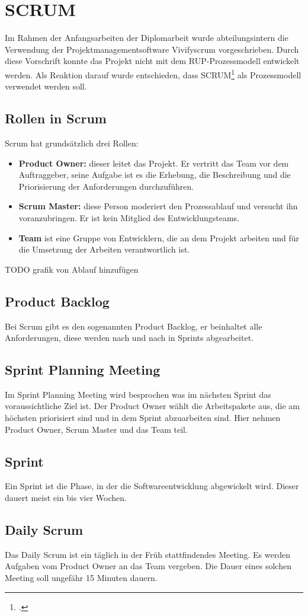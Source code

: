\section{SCRUM}
Im Rahmen der Anfangsarbeiten der Diplomarbeit wurde abteilungsintern die Verwendung der Projektmanagementsoftware Vivifyscrum vorgeschrieben. Durch diese Vorschrift konnte das Projekt nicht mit dem RUP-Prozessmodell entwickelt werden. 
Als Reaktion darauf wurde entschieden, dass SCRUM\footcite{scrum} als Prozessmodell verwendet werden soll.
\subsection{Rollen in Scrum}
Scrum hat grundsätzlich drei Rollen:
\begin{itemize} 
	\item \textbf{Product Owner:} dieser leitet das Projekt. Er vertritt das Team vor dem Auftraggeber, seine Aufgabe ist es die Erhebung, die Beschreibung und die Priorisierung der Anforderungen durchzuführen.
	\item \textbf{Scrum Master:} diese Person moderiert den Prozessablauf und versucht ihn voranzubringen. Er ist kein Mitglied des Entwicklungsteams.
	\item \textbf{Team} ist eine Gruppe von Entwicklern, die an dem Projekt arbeiten und für die Umsetzung der Arbeiten verantwortlich ist.
\end{itemize}
TODO grafik von Ablauf hinzufügen
\subsection{Product Backlog}
Bei Scrum gibt es den sogenannten Product Backlog, er beinhaltet alle Anforderungen, diese werden nach und nach in Sprints abgearbeitet.
\subsection{Sprint Planning Meeting}
Im Sprint Planning Meeting wird besprochen was im nächsten Sprint das voraussichtliche Ziel ist. Der Product Owner wählt die Arbeitspakete aus, die am höchsten priorisiert sind und in dem Sprint abzuarbeiten sind. Hier nehmen Product Owner, Scrum Master und das Team teil. 
\subsection{Sprint}
Ein Sprint ist die Phase, in der die Softwareentwicklung abgewickelt wird. Dieser dauert meist ein bis vier Wochen. 
\subsection{Daily Scrum}
Das Daily Scrum ist ein täglich in der Früh stattfindendes Meeting. Es werden Aufgaben vom Product Owner an das Team vergeben. Die Dauer eines solchen Meeting soll ungefähr 15 Minuten dauern.
